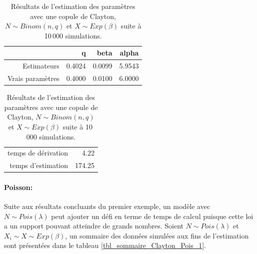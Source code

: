 \documentclass{article}
\begin{document}
	\begin{table}[H]
		\centering
		\begin{tabular}{rrrr}
			\hline
			& q & beta & alpha \\ 
			\hline
			Estimateurs & 0.4024 & 0.0099 & 5.9543 \\ 
			Vrais paramètres & 0.4000 & 0.0100 & 6.0000 \\ 
			\hline
		\end{tabular}
		\begin{tabular}{rr}
			\hline
			&  \\ 
			\hline
			temps de dérivation & 4.22 \\ 
			temps d'estimation & 174.25 \\ 
			\hline
		\end{tabular}
		\caption[Estimations avec une copule de Clayton et $N\sim Binomiale$]{Résultats de l'estimation des paramètres avec une copule de Clayton, $N\sim Binom(n,q)$ et $X \sim Exp(\beta)$ suite à 10\,000 simulations.} \label{tbl_Clayton_Binom}
	\end{table}
	
	\paragraph{Poisson:}Suite aux résultats concluants du premier exemple, un modèle avec $N \sim Pois(\lambda)$ peut ajouter un défi en terme de temps de calcul puisque cette loi a un support pouvant atteindre de grands nombres. Soient $N \sim Pois(\lambda)$ et $X_i \sim X \sim Exp(\beta)$, un sommaire des données simulées aux fins de l'estimation sont présentées dans le tableau \ref{tbl_sommaire_Clayton_Pois_1}.
	
\end{document}
